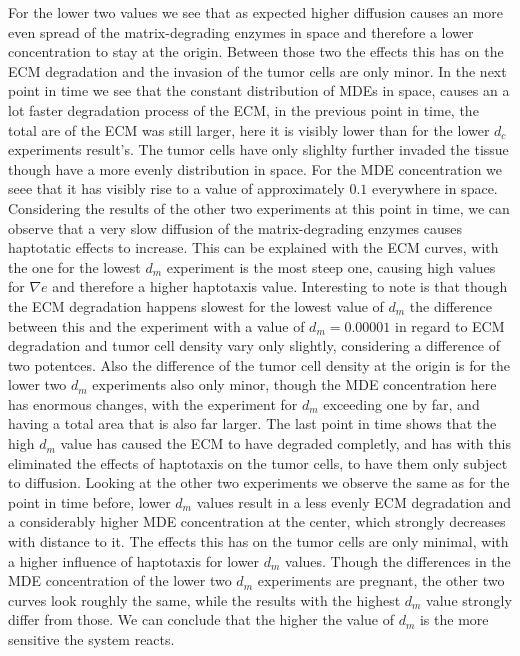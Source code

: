 For the lower two values we see that as expected higher diffusion causes an more even spread of the matrix-degrading enzymes in space and therefore a lower concentration to stay at the origin. Between those two the effects this has on the ECM degradation and the invasion of the tumor cells are only minor. \newline 
In the next point in time we see that the constant distribution of MDEs in space, causes an a lot faster degradation process of the ECM, in the previous point in time, the total are of the ECM was still larger, here it is visibly lower than for the lower $d_c$ experiments result's. The tumor cells have only slighlty further invaded the tissue though have a more evenly distribution in space. For the MDE concentration we seee that it has visibly rise to a value of approximately $0.1$ everywhere in space. 
Considering the results of the other two experiments at this point in time, we can observe that a very slow diffusion of the matrix-degrading enzymes causes haptotatic effects to increase. This can be explained with the ECM curves, with the one for the lowest $d_m$ experiment is the most steep one, causing high values for $\nabla e$ and therefore a higher haptotaxis value. Interesting to note is that though the ECM degradation happens slowest for the lowest value of $d_m$ the difference between this and the experiment with a value of $d_m=0.00001$ in regard to ECM degradation and tumor cell density vary only slightly, considering a difference of two potentces. Also the difference of the tumor cell density at the origin is for the lower two $d_m$ experiments also only minor, though the MDE concentration here has enormous changes, with the experiment for $d_m$ exceeding one by far, and having a total area that is also far larger. \newline 
The last point in time shows that the high $d_m$ value has caused the ECM to have degraded completly, and has with this eliminated the effects of haptotaxis on the tumor cells, to have them only subject to diffusion. Looking at the other two experiments we observe the same as for the point in time before, lower $d_m$ values result in a less evenly ECM degradation and a considerably higher MDE concentration at the center, which strongly decreases with distance to it. The effects this has on the tumor cells are only minimal, with a higher influence of haptotaxis for lower $d_m$ values. \newline 
Though the differences in the MDE concentration of the lower two $d_m$ experiments are pregnant, the other two curves look roughly the same, while the results with the highest $d_m$ value strongly differ from those. We can conclude that the higher the value of $d_m$ is the more sensitive the system reacts.


